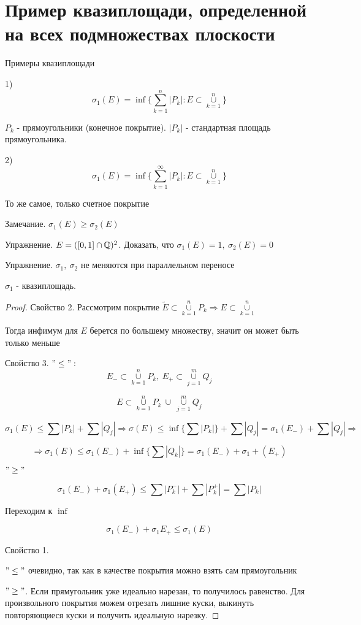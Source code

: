 \section{Пример квазиплощади, определенной на всех подмножествах плоскости \href{https://youtu.be/p9C57KDo1Yg?t=7344}{\Walley}}

Примеры квазиплощади

1)
\[\sigma_1(E) = \inf\{\sum_{k=1}^{n}|P_k| : E \subset \overset{n}{\underset{k=1}{\cup}}\} \]

$P_k$ - прямоугольники (конечное покрытие). $|P_k|$ - стандартная площадь прямоугольника.

2)
\[\sigma_1(E) = \inf\{\sum_{k=1}^{\infty}|P_k| : E \subset \overset{n}{\underset{k=1}{\cup}}\} \]

То же самое, только счетное покрытие

Замечание. $\sigma_1(E) \geq \sigma_2(E)$

Упражнение. $E = ([0, 1] \cap \mathbb{Q})^2$. Доказать, что $\sigma_1(E) = 1,\ \sigma_2(E) = 0$

Упражнение. $\sigma_1,\ \sigma_2$ не меняются при параллельном переносе

\begin{theorem}
    $\sigma_1$ - квазиплощадь.
\end{theorem}

\begin{proof}
    Свойство 2. Рассмотрим покрытие $\widetilde{E} \subset \overset{n}{\underset{k=1}{\cup}} P_k
    \Rightarrow E \subset \overset{n}{\underset{k=1}{\cup}}$

    Тогда инфимум для $E$ берется по большему множеству, значит он может быть только меньше

    Свойство 3. $"\leq":$
    \[E_{-} \subset \overset{n}{\underset{k=1}{\cup}} P_k,\ 
    E_{+} \subset \overset{m}{\underset{j=1}{\cup}} Q_j\]

    \[E \subset \overset{n}{\underset{k=1}{\cup}} P_k\ \cup\ \overset{m}{\underset{j=1}{\cup}} Q_j\]

    \[\sigma_1(E) \leq \sum |P_k| + \sum |Q_j| \Rightarrow \sigma(E) \leq \inf
    \{ \sum |P_k| \} + \sum |Q_j| = \sigma_1(E_{-}) + \sum |Q_j| \Rightarrow \]

    \[ \Rightarrow \sigma_1(E) \leq \sigma_1(E_{-}) + \inf \{ \sum |Q_k| \} =
    \sigma_1(E_{-}) + \sigma_1 + (E_{+}) \]

    $"\geq"$

    \[ \sigma_1(E_{-}) + \sigma_1(E_{+}) \leq \sum |P_k^{-}| + \sum |P_k^{+}| = \sum |P_k|\]

    Переходим к $\inf$

    \[ \sigma_1(E_{-}) + \sigma_1{E_{+}} \leq \sigma_1(E) \]

    Свойство 1.

    $"\leq"$ очевидно, так как в качестве покрытия можно взять сам прямоугольник

    $"\geq"$. Если прямугольник уже идеально нарезан, то получилось равенство.
    Для произвольного покрытия можем отрезать лишние куски, выкинуть повторяющиеся куски и получить идеальную нарезку.
\end{proof}